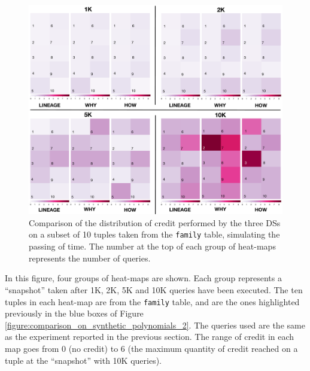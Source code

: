 \begin{figure}[t]
  \includegraphics[width=\textwidth]{figures/comparison_2}
  \caption{Comparison of the distribution of credit performed by the three DSs on a subset of 10 tuples taken from the \texttt{family} table, simulating the passing of time. The number at the top of each group of heat-maps represents the number of queries.}
  \label{fig:comparison}
\end{figure}


In this figure, four groups of heat-maps are shown. Each group represents a ``snapshot'' taken %
after 1K, 2K, 5K and 10K queries have been executed.  The ten tuples in each heat-map are from the \texttt{family} table, and are the ones highlighted previously in the blue boxes of Figure \ref{figure:comparison_on_synthetic_polynomials_2}.  
The queries used are the same as the experiment reported in the previous section. The range of credit in each map goes from 0 (no credit) to 6 (the maximum quantity of credit reached on a tuple at the ``snapshot'' with 10K queries).


